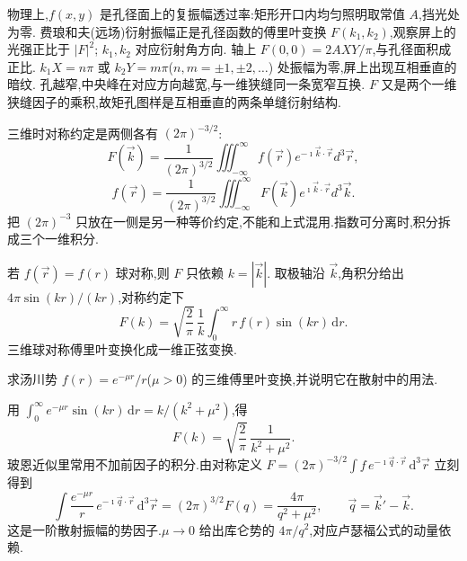 物理上,$f(x,y)$ 是孔径面上的复振幅透过率:矩形开口内均匀照明取常值 $A$,挡光处为零.
费琅和夫(远场)衍射振幅正是孔径函数的傅里叶变换 $F(k_1,k_2)$,观察屏上的光强正比于 $|F|^2$;
$k_1,k_2$ 对应衍射角方向.
轴上 $F(0,0)=2AXY/\pi$,与孔径面积成正比.
$k_1 X=n\pi$ 或 $k_2 Y=m\pi$($n,m=\pm 1,\pm 2,\ldots$) 处振幅为零,屏上出现互相垂直的暗纹.
孔越窄,中央峰在对应方向越宽,与一维狭缝同一条宽窄互换.
$F$ 又是两个一维狭缝因子的乘积,故矩孔图样是互相垂直的两条单缝衍射结构.

三维时对称约定是两侧各有 $(2\pi)^{-3/2}$:
\begin{equation}
    F(\vec{k})=\frac{1}{(2 \pi)^{3/2}} \iiint_{-\infty}^{\infty} f(\vec{r}) e^{-\imath  \vec{k} \cdot \vec{r}} d^3 \vec{r},
\end{equation}
\begin{equation}
     f(\vec{r})=\frac{1}{(2 \pi)^{3/2}}\iiint_{-\infty}^{\infty} F(\vec{k}) e^{\imath \vec{k} \cdot \vec{r}} d^3 \vec{k}.
\end{equation}
把 $(2\pi)^{-3}$ 只放在一侧是另一种等价约定,不能和上式混用.指数可分离时,积分拆成三个一维积分.

若 $f(\vec{r})=f(r)$ 球对称,则 $F$ 只依赖 $k=|\vec{k}|$.
取极轴沿 $\vec{k}$,角积分给出 $4\pi\sin(kr)/(kr)$,对称约定下
\begin{equation}
    F(k)
    =\sqrt{\frac{2}{\pi}}\,\frac{1}{k}
      \int_0^{\infty} r\,f(r)\sin(kr)\,\mathrm{d}r.
\end{equation}
三维球对称傅里叶变换化成一维正弦变换.

\begin{example}
求汤川势 $f(r)=e^{-\mu r}/r$($\mu>0$) 的三维傅里叶变换,并说明它在散射中的用法.
\end{example}
\begin{solution}
用 $\int_0^{\infty}e^{-\mu r}\sin(kr)\,\mathrm{d}r=k/(k^2+\mu^2)$,得
\begin{equation}
    F(k)=\sqrt{\frac{2}{\pi}}\,\frac{1}{k^2+\mu^2}.
\end{equation}
玻恩近似里常用不加前因子的积分.由对称定义
$F=(2\pi)^{-3/2}\int f\,e^{-\imath\vec{q}\cdot\vec{r}}\,\mathrm{d}^3\vec{r}$ 立刻得到
\begin{equation}
    \int\frac{e^{-\mu r}}{r}\,e^{-\imath\vec{q}\cdot\vec{r}}\,\mathrm{d}^3\vec{r}
    =(2\pi)^{3/2}F(q)
    =\frac{4\pi}{q^2+\mu^2},
    \qquad \vec{q}=\vec{k}'-\vec{k}.
\end{equation}
这是一阶散射振幅的势因子.$\mu\to 0$ 给出库仑势的 $4\pi/q^2$,对应卢瑟福公式的动量依赖.
\end{solution}